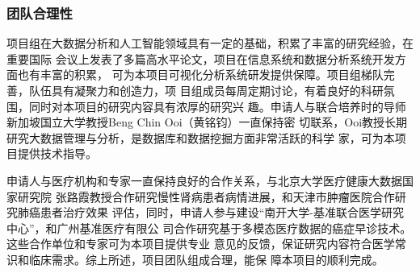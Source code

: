\subsubsection{团队合理性}

项目组在大数据分析和人工智能领域具有一定的基础，积累了丰富的研究经验，在重要国际
会议上发表了多篇高水平论文，项目在信息系统和数据分析系统开发方面也有丰富的积累，
可为本项目可视化分析系统研发提供保障。项目组梯队完善，队伍具有凝聚力和创造力，项
目组成员每周定期讨论，有着良好的科研氛围，同时对本项目的研究内容具有浓厚的研究兴
趣。申请人与联合培养时的导师新加坡国立大学教授Beng Chin Ooi（黄铭钧）一直保持密
切联系，Ooi教授长期研究大数据管理与分析，是数据库和数据挖掘方面非常活跃的科学
家，可为本项目提供技术指导。

申请人与医疗机构和专家一直保持良好的合作关系，与北京大学医疗健康大数据国家研究院
张路霞教授合作研究慢性肾病患者病情进展，和天津市肿瘤医院合作研究肺癌患者治疗效果
评估，同时，申请人参与建设“南开大学-基准联合医学研究中心”，和广州基准医疗有限公
司合作研究基于多模态医疗数据的癌症早诊技术。这些合作单位和专家可为本项目提供专业
意见的反馈，保证研究内容符合医学常识和临床需求。综上所述，项目团队组成合理，能保
障本项目的顺利完成。